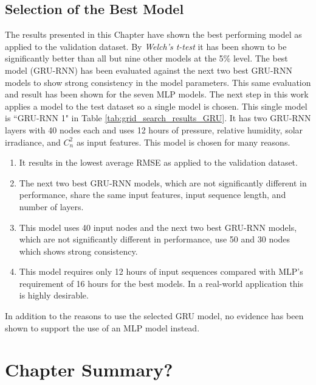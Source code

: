 \subsection{Selection of the Best Model}
The results presented in this Chapter have shown the best performing model as applied to the validation dataset. By \textit{Welch's t-test} it has been shown to be significantly better than all but nine other models at the 5\% level. The best model (\ac{GRU-RNN}) has been evaluated against the next two best \ac{GRU-RNN} models to show strong consistency in the model parameters. This same evaluation and result has been shown for the seven \ac{MLP} models. The next step in this work applies a model to the test dataset so a single model is chosen. This single model is ``GRU-RNN 1" in Table \ref{tab:grid_search_results_GRU}. It has two \ac{GRU-RNN} layers with 40 nodes each and uses 12 hours of pressure, relative humidity, solar irradiance, and $C_{n}^{2}$ as input features. This model is chosen for many reasons.
\begin{enumerate}
	\item It results in the lowest average RMSE as applied to the validation dataset.
	\item The next two best \ac{GRU-RNN} models, which are not significantly different in performance, share the same input features, input sequence length, and number of layers.
	\item This model uses 40 input nodes and the next two best \ac{GRU-RNN} models, which are not significantly different in performance, use 50 and 30 nodes which shows strong consistency.
	\item This model requires only 12 hours of input sequences compared with \ac{MLP}'s requirement of 16 hours for the best models. In a real-world application this is highly desirable.
\end{enumerate}
In addition to the reasons to use the selected GRU model, no evidence has been shown to support the use of an \ac{MLP} model instead.

\section{Chapter Summary?}